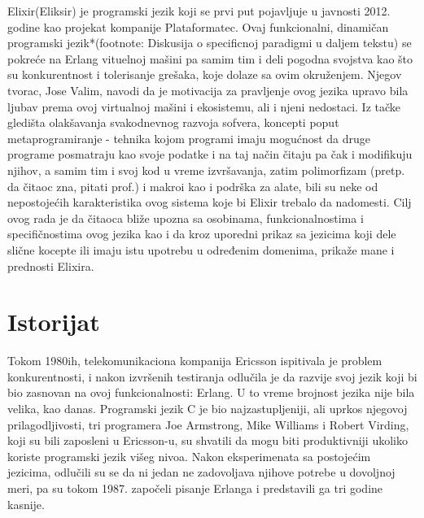 \documentclass[a4paper]{article}
\begin{document}
Elixir(Eliksir) je programski jezik koji se prvi put pojavljuje u javnosti 2012. godine kao projekat kompanije Plataformatec. Ovaj funkcionalni, dinamičan programski jezik*(footnote: Diskusija o specificnoj paradigmi u daljem tekstu) se pokreće na Erlang vituelnoj mašini pa samim tim i deli pogodna svojstva kao što su konkurentnost i tolerisanje grešaka, koje dolaze sa ovim okruženjem. Njegov tvorac, Jose Valim, navodi da je motivacija za pravljenje ovog jezika upravo bila ljubav prema ovoj virtualnoj mašini i ekosistemu, ali i njeni nedostaci. Iz tačke gledišta olakšavanja svakodnevnog razvoja sofvera, koncepti poput metaprogramiranje - tehnika kojom programi imaju mogućnost da druge programe posmatraju kao svoje podatke i na taj način čitaju pa čak i modifikuju njihov, a samim tim i svoj kod u vreme izvršavanja, zatim polimorfizam (pretp. da čitaoc zna, pitati prof.) i makroi kao i podrška za alate, bili su neke od nepostojećih karakteristika ovog sistema koje bi Elixir trebalo da nadomesti. Cilj ovog rada je da čitaoca bliže upozna sa osobinama, funkcionalnostima i specifičnostima ovog jezika kao i da kroz uporedni prikaz sa jezicima koji dele slične kocepte ili imaju istu upotrebu u određenim domenima, prikaže mane i prednosti Elixira.

\section{Istorijat}
\label{sec:istorijat}

Tokom 1980ih, telekomunikaciona kompanija Ericsson ispitivala je problem konkurentnosti, i nakon izvršenih testiranja odlučila je da razvije svoj jezik koji bi bio zasnovan na ovoj funkcionalnosti: Erlang. U to vreme brojnost jezika nije bila velika, kao danas. Programski jezik C je bio najzastupljeniji, ali uprkos njegovoj prilagodljivosti, tri programera Joe Armstrong, Mike Williams i Robert Virding, koji su bili zaposleni u Ericsson-u, su shvatili da mogu biti produktivniji ukoliko koriste programski jezik višeg nivoa. Nakon eksperimenata sa postojećim jezicima, odlučili su se da ni jedan ne zadovoljava njihove potrebe u dovoljnoj meri, pa su tokom 1987. započeli pisanje Erlanga i predstavili ga tri godine kasnije.
\end{document}
